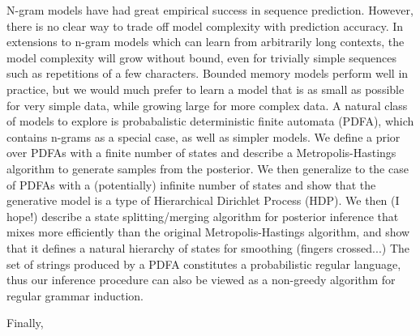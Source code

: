 N-gram models have had great empirical success in sequence prediction.  However, there is no clear way to trade off model complexity with prediction accuracy.  In extensions to n-gram models which can learn from arbitrarily long contexts, the model complexity will grow without bound, even for trivially simple sequences such as repetitions of a few characters.  Bounded memory models perform well in practice, but we would much prefer to learn a model that is as small as possible for very simple data, while growing large for more complex data.  A natural class of models to explore is probabalistic deterministic finite automata (PDFA), which contains n-grams as a special case, as well as simpler models.  We define a prior over PDFAs with a finite number of states and describe a Metropolis-Hastings algorithm to generate samples from the posterior.  We then generalize to the case of PDFAs with a (potentially) infinite number of states and show that the generative model is a type of Hierarchical Dirichlet Process (HDP).  We then (I hope!) describe a state splitting/merging algorithm for posterior inference that mixes more efficiently than the original Metropolis-Hastings algorithm, and show that it defines a natural hierarchy of states for smoothing (fingers crossed...)  The set of strings produced by a PDFA constitutes a probabilistic regular language, thus our inference procedure can also be viewed as a non-greedy algorithm for regular grammar induction.

Finally, 